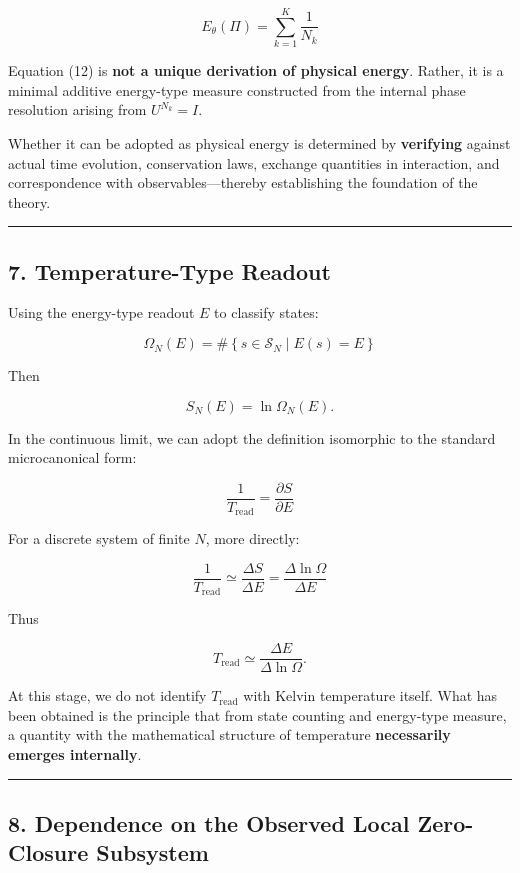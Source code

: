 \documentclass[
  a4paper,
]{article}
\begin{document}
\[
E_{\theta}(\Pi)
=
\sum_{k=1}^{K}\frac{1}{N_k}
\tag{12}
\]

Equation (12) is \textbf{not a unique derivation of physical energy}.
Rather, it is a minimal additive energy-type measure constructed from
the internal phase resolution arising from \(U^{N_k}=I\).

Whether it can be adopted as physical energy is determined by
\textbf{verifying} against actual time evolution, conservation laws,
exchange quantities in interaction, and correspondence with
observables---thereby establishing the foundation of the theory.

\begin{center}\rule{0.5\linewidth}{0.5pt}\end{center}

\subsection{7. Temperature-Type Readout}\label{temperature-type-readout}

Using the energy-type readout \(E\) to classify states:

\[
\Omega_N(E)
=
\#\left\{
s\in\mathcal{S}_N
\mid
E(s)=E
\right\}
\tag{13}
\]

Then

\[
S_N(E)
=
\ln\Omega_N(E).
\tag{14}
\]

In the continuous limit, we can adopt the definition isomorphic to the
standard microcanonical form:

\[
\frac{1}{T_{\mathrm{read}}}
=
\frac{\partial S}{\partial E}
\tag{15}
\]

For a discrete system of finite \(N\), more directly:

\[
\frac{1}{T_{\mathrm{read}}}
\simeq
\frac{\Delta S}{\Delta E}
=
\frac{\Delta\ln\Omega}{\Delta E}
\tag{16}
\]

Thus

\[
T_{\mathrm{read}}
\simeq
\frac{\Delta E}{\Delta\ln\Omega}.
\tag{17}
\]

At this stage, we do not identify \(T_{\mathrm{read}}\) with Kelvin
temperature itself. What has been obtained is the principle that from
state counting and energy-type measure, a quantity with the mathematical
structure of temperature \textbf{necessarily emerges internally}.

\begin{center}\rule{0.5\linewidth}{0.5pt}\end{center}

\subsection{8. Dependence on the Observed Local Zero-Closure
Subsystem}\label{dependence-on-the-observed-local-zero-closure-subsystem}
\end{document}
